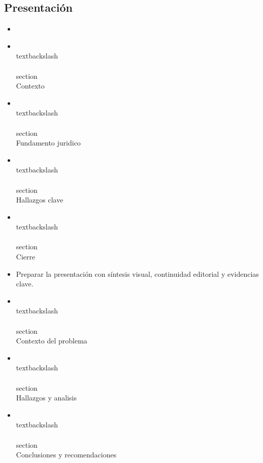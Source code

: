 \documentclass[12pt]{article}
\begin{document}
\subsection*{Presentación}
\begin{itemize}[leftmargin=*]
  \item \\%
  \item \\textbackslash\\{\\}section\\{Contexto\\}
  \item \\textbackslash\\{\\}section\\{Fundamento juridico\\}
  \item \\textbackslash\\{\\}section\\{Hallazgos clave\\}
  \item \\textbackslash\\{\\}section\\{Cierre\\}
  \item Preparar la presentación con síntesis visual, continuidad editorial y evidencias clave.
  \item \\textbackslash\\{\\}section\\{Contexto del problema\\}
  \item \\textbackslash\\{\\}section\\{Hallazgos y analisis\\}
  \item \\textbackslash\\{\\}section\\{Conclusiones y recomendaciones\\}

\end{itemize}
\end{document}
